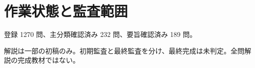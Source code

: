 \chapter{作業状態と監査範囲}
登録 1270 問、主分類確認済み 232 問、要旨確認済み 189 問。
\par 解説は一部の初稿のみ。初期監査と最終監査を分け、最終完成は未判定。全問解説の完成教材ではない。
